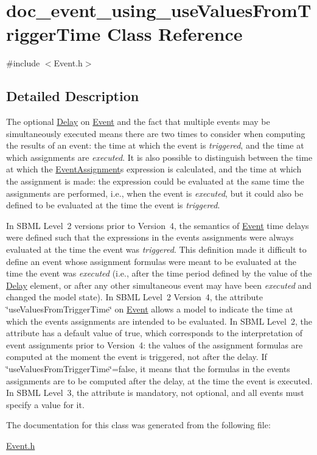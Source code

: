 \hypertarget{classdoc__event__using__use_values_from_trigger_time}{}\section{doc\+\_\+event\+\_\+using\+\_\+use\+Values\+From\+Trigger\+Time Class Reference}
\label{classdoc__event__using__use_values_from_trigger_time}


{\ttfamily \#include $<$Event.\+h$>$}



\subsection{Detailed Description}
\begin{DoxyParagraph}{}
The optional \hyperlink{class_delay}{Delay} on \hyperlink{class_event}{Event} and the fact that multiple events may be simultaneously executed means there are two times to consider when computing the results of an event\+: the time at which the event is {\itshape triggered}, and the time at which assignments are {\itshape executed}. It is also possible to distinguish between the time at which the \hyperlink{class_event_assignment}{Event\+Assignment}\textquotesingle{}s expression is calculated, and the time at which the assignment is made\+: the expression could be evaluated at the same time the assignments are performed, i.\+e., when the event is {\itshape executed}, but it could also be defined to be evaluated at the time the event is {\itshape triggered}.
\end{DoxyParagraph}
In S\+B\+ML Level~2 versions prior to Version~4, the semantics of \hyperlink{class_event}{Event} time delays were defined such that the expressions in the event\textquotesingle{}s assignments were always evaluated at the time the event was {\itshape triggered}. This definition made it difficult to define an event whose assignment formulas were meant to be evaluated at the time the event was {\itshape executed} (i.\+e., after the time period defined by the value of the \hyperlink{class_delay}{Delay} element, or after any other simultaneous event may have been {\itshape executed} and changed the model state). In S\+B\+ML Level~2 Version~4, the attribute \char`\"{}use\+Values\+From\+Trigger\+Time\char`\"{} on \hyperlink{class_event}{Event} allows a model to indicate the time at which the event\textquotesingle{}s assignments are intended to be evaluated. In S\+B\+ML Level~2, the attribute has a default value of {\ttfamily true}, which corresponds to the interpretation of event assignments prior to Version~4\+: the values of the assignment formulas are computed at the moment the event is triggered, not after the delay. If \char`\"{}use\+Values\+From\+Trigger\+Time\char`\"{}={\ttfamily false}, it means that the formulas in the event\textquotesingle{}s assignments are to be computed after the delay, at the time the event is executed. In S\+B\+ML Level~3, the attribute is mandatory, not optional, and all events must specify a value for it. 

The documentation for this class was generated from the following file\+:\begin{DoxyCompactItemize}
\item 
\hyperlink{_event_8h}{Event.\+h}\end{DoxyCompactItemize}
